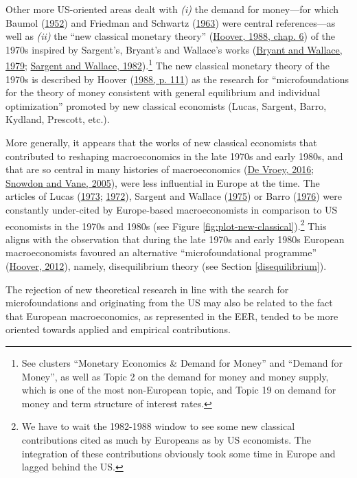 \documentclass[
  12pt,
  onecolumn]{article}
\begin{document}
Other more US-oriented areas dealt with \emph{(i)} the demand for
money---for which Baumol (\protect\hyperlink{ref-baumol1952}{1952}) and
Friedman and Schwartz (\protect\hyperlink{ref-friedman1963}{1963}) were
central references---as well as \emph{(ii)} the ``new classical monetary
theory'' (\protect\hyperlink{ref-hoover1988}{Hoover, 1988, chap. 6}) of
the 1970s inspired by Sargent's, Bryant's and Wallace's works
(\protect\hyperlink{ref-bryant1979}{Bryant and Wallace, 1979};
\protect\hyperlink{ref-sargent1982}{Sargent and Wallace,
1982}).\footnote{See clusters ``Monetary Economics \& Demand for Money''
  and ``Demand for Money'', as well as Topic 2 on the demand for money
  and money supply, which is one of the most non-European topic, and
  Topic 19 on demand for money and term structure of interest rates.}
The new classical monetary theory of the 1970s is described by Hoover
(\protect\hyperlink{ref-hoover1988}{1988, p. 111}) as the research for
``microfoundations for the theory of money consistent with general
equilibrium and individual optimization'' promoted by new classical
economists (Lucas, Sargent, Barro, Kydland, Prescott, etc.).

More generally, it appears that the works of new classical economists
that contributed to reshaping macroeconomics in the late 1970s and early
1980s, and that are so central in many histories of macroeconomics
(\protect\hyperlink{ref-devroey2016}{De Vroey, 2016};
\protect\hyperlink{ref-snowdon2005}{Snowdon and Vane, 2005}), were less
influential in Europe at the time. The articles of Lucas
(\protect\hyperlink{ref-lucas1973}{1973};
\protect\hyperlink{ref-lucas1972}{1972}), Sargent and Wallace
(\protect\hyperlink{ref-sargent1975}{1975}) or Barro
(\protect\hyperlink{ref-barro1976}{1976}) were constantly under-cited by
Europe-based macroeconomists in comparison to US economists in the 1970s
and 1980s (see Figure \ref{fig:plot-new-classical}).\footnote{We have to
  wait the 1982-1988 window to see some new classical contributions
  cited as much by Europeans as by US economists. The integration of
  these contributions obviously took some time in Europe and lagged
  behind the US.} This aligns with the observation that during the late
1970s and early 1980s European macroeconomists favoured an alternative
``microfoundational programme''
(\protect\hyperlink{ref-hoover2012}{Hoover, 2012}), namely,
disequilibrium theory (see Section \ref{disequilibrium}).

The rejection of new theoretical research in line with the search for
microfoundations and originating from the US may also be related to the
fact that European macroeconomics, as represented in the EER, tended to
be more oriented towards applied and empirical contributions.
\end{document}
